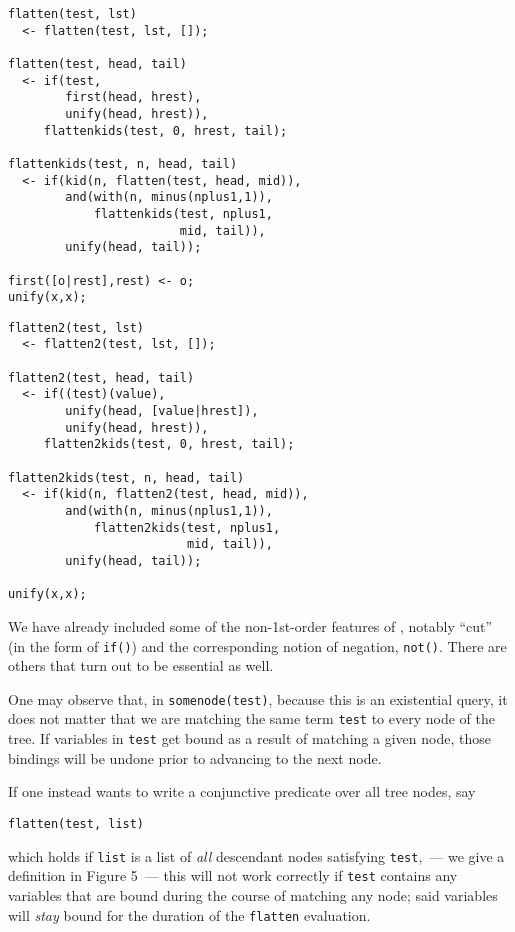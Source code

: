 

\begin{verbatim}
flatten(test, lst)
  <- flatten(test, lst, []);

flatten(test, head, tail)
  <- if(test,
        first(head, hrest),
        unify(head, hrest)),
     flattenkids(test, 0, hrest, tail);

flattenkids(test, n, head, tail)
  <- if(kid(n, flatten(test, head, mid)),
        and(with(n, minus(nplus1,1)),
            flattenkids(test, nplus1,
                        mid, tail)),
        unify(head, tail));

first([o|rest],rest) <- o;
unify(x,x);
\end{verbatim}


\begin{verbatim}
flatten2(test, lst)
  <- flatten2(test, lst, []);

flatten2(test, head, tail)
  <- if((test)(value),
        unify(head, [value|hrest]),
        unify(head, hrest)),
     flatten2kids(test, 0, hrest, tail);

flatten2kids(test, n, head, tail)
  <- if(kid(n, flatten2(test, head, mid)),
        and(with(n, minus(nplus1,1)),
            flatten2kids(test, nplus1,
                         mid, tail)),
        unify(head, tail));

unify(x,x);
\end{verbatim}

\secup %

\secdown %

We have already included some of the non-1st-order features of \prolog, notably
``cut'' (in the form of \verb|if()|) and the corresponding notion of negation,
\verb|not()|. There are others that turn out to be essential as well.

\label{crew31}

One may observe that, in \verb|somenode(test)|, because this is an existential
query, it does not matter that we are matching the same term \verb|test| to
every node of the tree. If variables in \verb|test| get bound as a result of
matching a given node, those bindings will be undone prior to advancing to the
next node.

If one instead wants to write a conjunctive predicate over all tree nodes, say
\begin{verbatim}
flatten(test, list)
\end{verbatim}
which holds if \verb|list| is a list of \emph{all} descendant nodes satisfying
\verb|test|,\ --- we give a definition in Figure 5\ --- this will not work
correctly if \verb|test| contains any variables that are bound during the course
of matching any node; said variables will \emph{stay} bound for the duration of
the \verb|flatten| evaluation.


